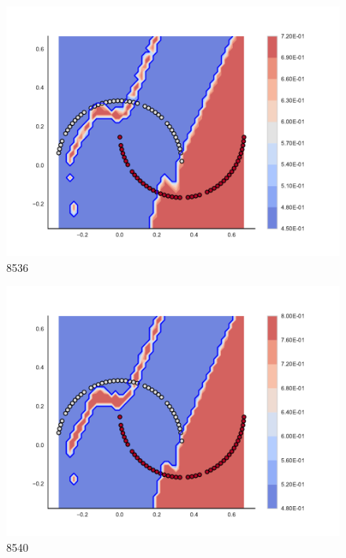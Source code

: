 \begin{subfigure}[b]{0.09\textwidth}
    \includegraphics[clip, trim=2.35cm 1.75cm 4.5cm 0cm,width=\textwidth]{img/convergence/8536.pdf}
    \caption{8536}
    \label{fig:convergence_8536}
\end{subfigure}
%
\begin{subfigure}[b]{0.09\textwidth}
    \includegraphics[clip, trim=2.35cm 1.75cm 4.5cm 0cm,width=\textwidth]{img/convergence/8540.pdf}
    \caption{8540}
    \label{fig:convergence_8540}
\end{subfigure}
%
